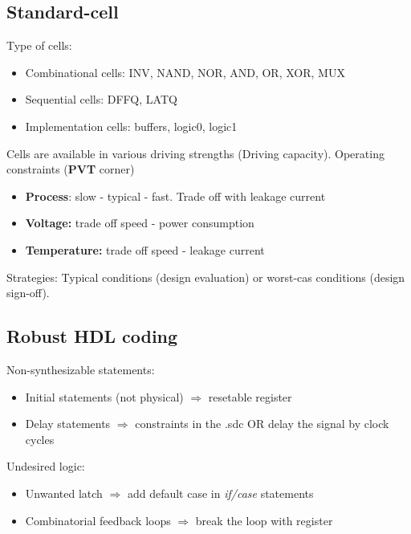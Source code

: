   \subsection{Standard-cell}
  
  Type of cells:
  \begin{itemize}
  \item Combinational cells: INV, NAND, NOR, AND, OR, XOR, MUX
  \item Sequential cells: DFFQ, LATQ
  \item Implementation cells: buffers, logic0, logic1
  \end{itemize}

  Cells are available in various driving strengths (Driving capacity).
\bigbreak
Operating constraints (\textbf{PVT} corner)
\begin{itemize}
  \item \textbf{Process}: slow - typical - fast. Trade off with leakage current
  \item \textbf{Voltage:} trade off speed - power consumption
  \item \textbf{Temperature:} trade off speed - leakage current
\end{itemize}
Strategies: Typical conditions (design evaluation) or worst-cas conditions (design sign-off).

\subsection{Robust HDL coding}
\label{Robust-HDL-coding}
Non-synthesizable statements:
\begin{itemize}
  \item Initial statements (not physical) \(\Rightarrow\) resetable register
  \item Delay statements \(\Rightarrow\) constraints in the .sdc OR delay the signal by clock cycles
\end{itemize}

Undesired logic:
\begin{itemize}
  \item Unwanted latch \(\Rightarrow\) add default case in \textit{if/case} statements
  \item Combinatorial feedback loops \(\Rightarrow\) break the loop with register
\end{itemize}


